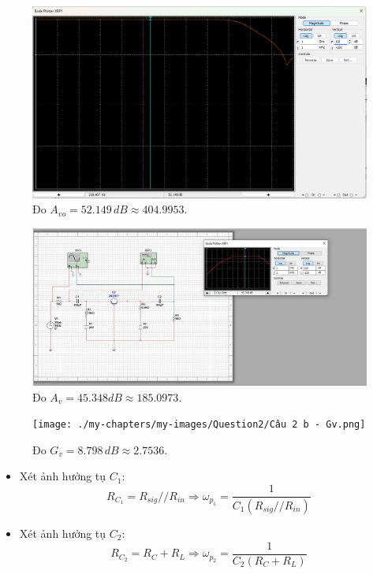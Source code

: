 \begin{figure}[H]
	\centering
	\includegraphics[width=\linewidth]{./my-chapters/my-images/Question2/b_avo.png}
	\caption{Đo $A_{vo} = 52.149\, dB \approx 404.9953$.}
\end{figure}

\begin{figure}[H]
	\centering
	\includegraphics[width=\linewidth]{./my-chapters/my-images/Question2/Câu 2 b - Sóng và Av.png}
	\caption{Đo $A_{v} = 45.348dB \approx 185.0973$.}
\end{figure}

\begin{figure}[H]
	\centering
	\texttt{[image: ./my-chapters/my-images/Question2/Câu 2 b - Gv.png]}
	\caption{Đo $G_{v} = 8.798\, dB \approx 2.7536$.}
\end{figure}


\begin{itemize}[label=-]
	\item Xét ảnh hưởng tụ $C_{1}$: 
	\[
	R_{C_{1}} = R_{sig} // R_{in}
	\Longrightarrow 
	\omega_{p_{1}} = \frac{1}{C_{1}\left(R_{sig} // R_{in} \right)}
	\]
	\item Xét ảnh hưởng tụ $C_{2}$: 
	\[
	R_{C_{2}} = R_{C} + R_{L}
	\Longrightarrow 
	\omega_{p_{2}} = \frac{1}{C_{2}\left(R_{C} + R_{L}\right)}
	\]
\end{itemize}

